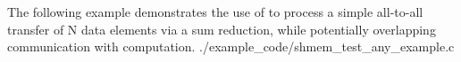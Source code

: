 \begin{apidefinition}


\begin{apiexamples}
  \apicexample
      {The following \CorCpp{} example demonstrates the use of
       to process a simple all-to-all transfer of N
      data elements via a sum reduction, while potentially overlapping
      communication with computation.}
      {./example_code/shmem_test_any_example.c}
      {}
\end{apiexamples}

\end{apidefinition}

